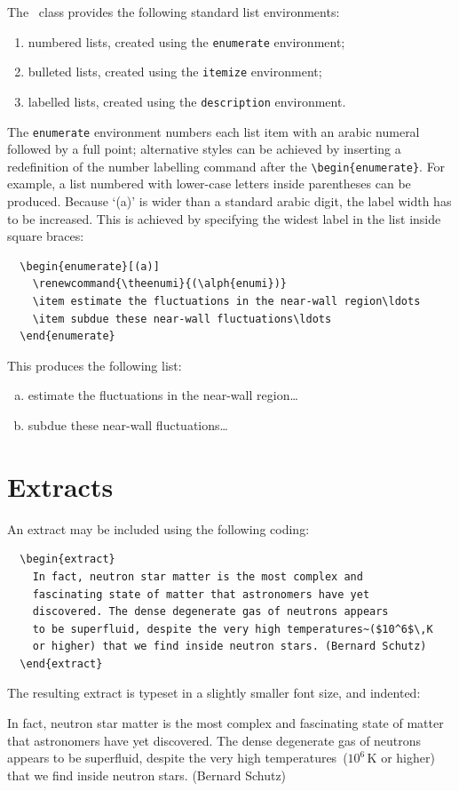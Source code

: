 The \cambridge\ class provides the following standard list environments:
\begin{enumerate}
 \item numbered lists, created using the \verb"enumerate" environment;
 \item bulleted lists, created using the \verb"itemize" environment;
 \item labelled lists, created using the \verb"description" environment.
\end{enumerate}
The \verb"enumerate" environment numbers each list item with an arabic numeral followed by a full point; alternative styles can be achieved by inserting a redefinition of the number labelling command after the \verb"\begin{enumerate}". For example, a list numbered with lower-case letters inside parentheses can be produced. Because `(a)' is wider than a standard arabic digit, the label width has to be increased. This is achieved by specifying the widest label in the list inside square braces:
\begin{verbatim}
  \begin{enumerate}[(a)]
    \renewcommand{\theenumi}{(\alph{enumi})}
    \item estimate the fluctuations in the near-wall region\ldots
    \item subdue these near-wall fluctuations\ldots
  \end{enumerate}
\end{verbatim}
This produces the following list:
  \begin{enumerate}[(a)]
    \renewcommand{\theenumi}{(\alph{enumi})}
    \item estimate the fluctuations in the near-wall region\ldots
    \item subdue these near-wall fluctuations\ldots
  \end{enumerate}


\section{Extracts}
\label{extracts}

An extract may be included using the following coding:
\begin{verbatim}
  \begin{extract}
    In fact, neutron star matter is the most complex and
    fascinating state of matter that astronomers have yet
    discovered. The dense degenerate gas of neutrons appears
    to be superfluid, despite the very high temperatures~($10^6$\,K
    or higher) that we find inside neutron stars. (Bernard Schutz)
  \end{extract}
\end{verbatim}
The resulting extract is typeset in a slightly smaller font size, and indented:
  \begin{extract}
    In fact, neutron star matter is the most complex and
    fascinating state of matter that astronomers have yet
    discovered. The dense degenerate gas of neutrons appears
    to be superfluid, despite the very high temperatures~($10^6$\,K
    or higher) that we find inside neutron stars. (Bernard Schutz)
  \end{extract}

